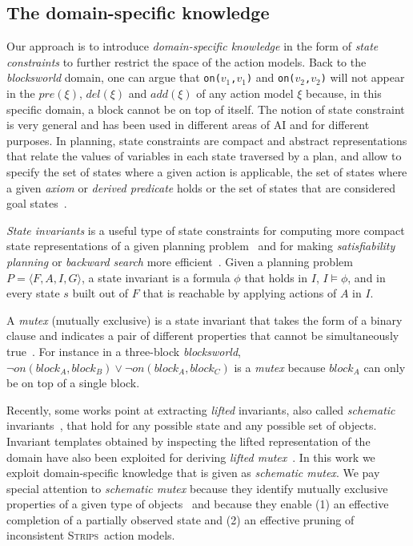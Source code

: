 \documentclass{article}
\newcommand{\tup}[1]{{\langle #1 \rangle}}
\newcommand{\strips}{\textsc{Strips}}
\begin{document}
\subsection{The domain-specific knowledge}

Our approach is to introduce {\em domain-specific knowledge} in the form of {\em state constraints} to further restrict the space of the action models. Back to the {\em blocksworld} domain, one can argue that {\small\tt on($v_1$,$v_1$)} and {\small\tt on($v_2$,$v_2$)} will not appear in the $pre(\xi)$, $del(\xi)$ and $add(\xi)$ of any action model $\xi$ because, in this specific domain, a block cannot be on top of itself. The notion of state constraint is very general and has been used in different areas of AI and for different purposes.  In planning, state constraints are compact and abstract representations that relate the values of variables in each state traversed by a plan, and allow to specify the set of states where a given action is applicable, the set of states where a given {\em axiom} or {\em derived predicate} holds or the set of states that are considered goal states~\cite{HaslumIR0TSN18}.

{\em State invariants} is a useful type of state constraints for computing more compact state representations of a given planning problem~\cite{helmert2009concise} and for making {\em satisfiability planning} or {\em backward search} more efficient~\cite{rintanen2014madagascar,alcazar2015reminder}. Given a planning problem $P=\tup{F,A,I,G}$, a state invariant is a formula $\phi$ that holds in $I$, $I\models \phi$, and in every state $s$ built out of $F$ that is reachable by applying actions of $A$ in $I$.

A {\em mutex} (mutually exclusive) is a state invariant that takes the form of a binary clause and indicates a pair of different properties that cannot be simultaneously true~\cite{kautz:mutex:IJCAI1999}. For instance in a three-block {\em blocksworld}, $\neg on(block_A,block_B)\vee \neg on(block_A,block_C)$ is a {\em mutex} because $block_A$ can only be on top of a single block.

Recently, some works point at extracting \emph{lifted} invariants, also called {\em schematic} invariants~\cite{rintanen:schematicInvariants:AAAI2017}, that hold for any possible state and any possible set of objects. Invariant
templates obtained by inspecting the lifted representation of the domain have also been exploited for deriving \emph{lifted mutex}~\cite{BernardiniFS18}. In this work we exploit domain-specific knowledge that is given as {\em schematic mutex}. We pay special attention to {\em schematic mutex} because they identify mutually exclusive properties of a given type of objects~\cite{fox:TIM:JAIR1998} and because they enable (1) an effective completion of a partially observed state and (2) an effective pruning of inconsistent \strips\ action models.
\end{document}
